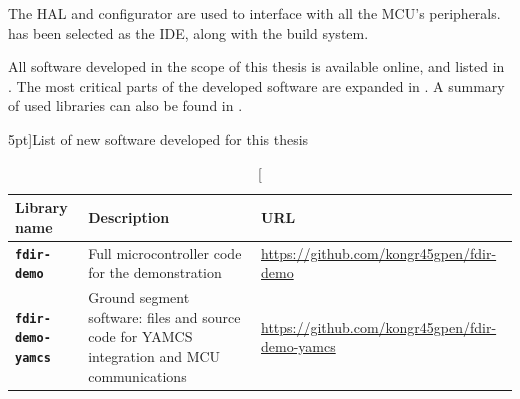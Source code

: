 \documentclass[a4paper,nobib]{tufte-book}
\begin{document}
The  \ac{HAL} and configurator are used to interface with all the \acs{MCU}'s peripherals.  has been selected as the \acs{IDE}, along with the  build system.

All software developed in the scope of this thesis is available online, and listed in . The most critical parts of the developed software are expanded in . A summary of used libraries can also be found in .

\begin{table}[h]
	\centering
	\caption[][5pt]{List of new software developed for this thesis}
	\label{tab:new_software}
	\begin{tabularx}{\textwidth}{@{}lXp{6cm}@{}}
		\toprule
		Library name & Description & URL \\ \midrule
		\textbf{\texttt{fdir-demo}} & Full microcontroller code for the demonstration & \small \url{https://github.com/kongr45gpen/fdir-demo} \\
		\textbf{\texttt{fdir-demo-yamcs}} & Ground segment software: files and source code for \acs{YAMCS} integration and \acs{MCU} communications & \small \url{https://github.com/kongr45gpen/fdir-demo-yamcs} \\
		\bottomrule
	\end{tabularx}
\end{table}
\end{document}
